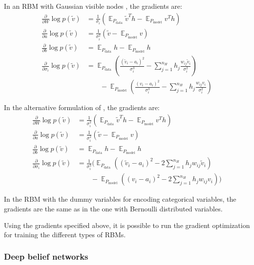 \documentclass[12pt]{article}
\DeclareMathOperator{\EX}{\mathbb{E}}
\begin{document}
In an RBM with Gaussian visible nodes \citep{krizhevsky2009tinyimagesthesis}, the  gradients are:
\begin{align*}
\frac{\partial}{\partial W} \log p(\tilde{v}) &= \frac{1}{\sigma_i} \left ( \EX_{P_\text{data}} \tilde{v}^T h - \EX_{P_\text{model}} v^T h \right) \\
\frac{\partial}{\partial a} \log p(\tilde{v}) &= \frac{1}{\sigma_i^2} \left(\tilde{v} - \EX_{P_\text{model}} v \right)\\
\frac{\partial}{\partial b} \log p(\tilde{v}) &= \EX_{P_\text{data}} h - \EX_{P_\text{model}} h \\
\frac{\partial}{\partial \sigma_{i}} \log p(\tilde{v}) &= \EX_{P_\text{data}} \left( \frac{(\tilde{v}_i - a_i)^2}{\sigma_i^3} - \sum_{j=1}^{n_H} h_j \frac{w_{ij} \tilde{v}_i}{\sigma_i^2}\right) \\ & \quad \quad - \EX_{P_\text{model}} \left(\frac{(v_i - a_i)^2}{\sigma_i^3} -\sum_{j=1}^{n_H} h_j \frac{w_{ij} v_i}{\sigma_i^2} \right)
\end{align*}

In the alternative formulation of \cite{cho2011improved}, the gradients are:
\begin{align*}
\frac{\partial}{\partial W} \log p(\tilde{v}) &= \frac{1}{\sigma_i^2} \left ( \EX_{P_\text{data}} \tilde{v}^T h - \EX_{P_\text{model}} v^T h \right) \\
\frac{\partial}{\partial a} \log p(\tilde{v}) &= \frac{1}{\sigma_i^2} \left(\tilde{v} - \EX_{P_\text{model}} v \right)\\
\frac{\partial}{\partial b} \log p(\tilde{v}) &= \EX_{P_\text{data}} h - \EX_{P_\text{model}} h \\
\frac{\partial}{\partial \sigma_{i}} \log p(\tilde{v}) &=  \frac{1}{\sigma_i^3} \Bigg( \EX_{P_\text{data}} \left( (\tilde{v}_i - a_i)^2 - 2\sum_{j=1}^{n_H} h_j w_{ij} \tilde{v}_i  \right) \\ & \quad \quad - \EX_{P_\text{model}} \left((v_i - a_i)^2 -2\sum_{j=1}^{n_H} h_j w_{ij} v_i \right) \Bigg)
\end{align*}

In the RBM with the dummy variables for encoding categorical variables, the gradients are the same as in the one with Bernoulli distributed variables.

Using the gradients specified above, it is possible to run the gradient optimization for training the different types of RBMs.

\subsubsection{Deep belief networks}\label{dbns}
\end{document}
